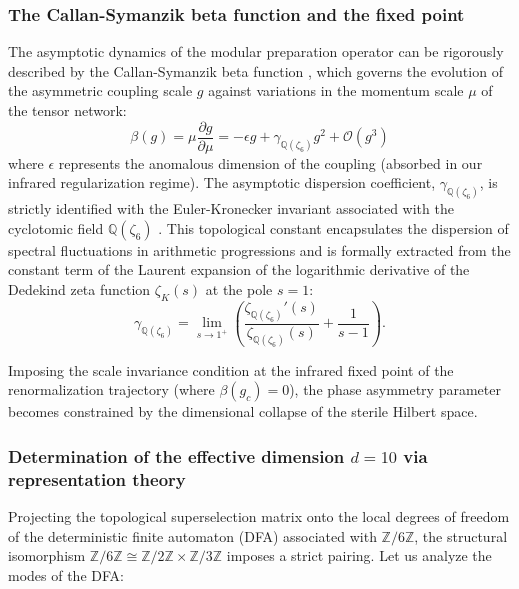 \documentclass[12pt,a4paper]{article}
\theoremstyle{plain}
\theoremstyle{definition}
\theoremstyle{remark}
\begin{document}
\subsubsection{The Callan-Symanzik beta function and the fixed point}

The asymptotic dynamics of the modular preparation operator can be rigorously described by the Callan-Symanzik beta function \cite{Callan1970}, which governs the evolution of the asymmetric coupling scale $g$ against variations in the momentum scale $\mu$ of the tensor network:
\begin{equation}
\beta(g) = \mu \frac{\partial g}{\partial \mu} = -\epsilon g + \gamma_{\mathbb{Q}(\zeta_6)} g^2 + \mathcal{O}(g^3)
\label{eq:beta_function}
\end{equation}
where $\epsilon$ represents the anomalous dimension of the coupling (absorbed in our infrared regularization regime). The asymptotic dispersion coefficient, $\gamma_{\mathbb{Q}(\zeta_6)}$, is strictly identified with the Euler-Kronecker invariant associated with the cyclotomic field $\mathbb{Q}(\zeta_6)$ \cite{Ihara2006}. This topological constant encapsulates the dispersion of spectral fluctuations in arithmetic progressions and is formally extracted from the constant term of the Laurent expansion of the logarithmic derivative of the Dedekind zeta function $\zeta_K(s)$ at the pole $s=1$:
\begin{equation}
\gamma_{\mathbb{Q}(\zeta_6)} = \lim_{s\to 1^+} \left( \frac{\zeta_{\mathbb{Q}(\zeta_6)}'(s)}{\zeta_{\mathbb{Q}(\zeta_6)}(s)} + \frac{1}{s-1} \right).
\end{equation}

Imposing the scale invariance condition at the infrared fixed point of the renormalization trajectory (where $\beta(g_c) = 0$), the phase asymmetry parameter becomes constrained by the dimensional collapse of the sterile Hilbert space.

\subsubsection{Determination of the effective dimension $d=10$ via representation theory}

Projecting the topological superselection matrix onto the local degrees of freedom of the deterministic finite automaton (DFA) associated with $\mathbb{Z}/6\mathbb{Z}$, the structural isomorphism $\mathbb{Z}/6\mathbb{Z} \cong \mathbb{Z}/2\mathbb{Z} \times \mathbb{Z}/3\mathbb{Z}$ imposes a strict pairing. Let us analyze the modes of the DFA:
\end{document}
